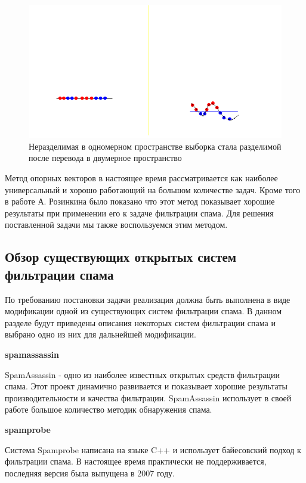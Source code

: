 \begin{figure}[h]
\begin{center}
\includegraphics[width=15cm]{img/svm2}
\end{center}
\caption{Неразделимая в одномерном пространстве выборка стала разделимой после перевода в двумерное пространство}
\label{svm-kernel}
\end{figure}

Метод опорных векторов в настоящее время рассматривается как наиболее универсальный и хорошо работающий на большом количестве задач. Кроме того в работе А. Розинкина было показано что этот метод показывает хорошие результаты при применении его к задаче фильтрации спама. Для решения поставленной задачи мы также воспользуемся этим методом.

\subsection{Обзор существующих открытых систем фильтрации спама}
По требованию постановки задачи реализация должна быть выполнена в виде модификации одной из существующих систем фильтрации спама. В данном разделе будут приведены описания некоторых систем фильтрации спама и выбрано одно из них для дальнейшей модификации. 

\textbf{spamassassin}

SpamAssassin - одно из наиболее известных открытых средств фильтрации спама. Этот проект динамично развивается и показывает хорошие результаты производительности и качества фильтрации. SpamAssassin использует в своей работе большое количество методик обнаружения спама.

\textbf{spamprobe}

Система Spamprobe написана на языке C++ и использует байесовский подход к фильтрации спама. В настоящее время практически не поддерживается, последняя версия была выпущена в 2007 году.

